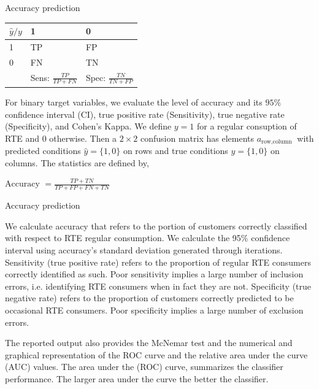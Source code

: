 \documentclass[12pt]{beamer}
\begin{document}
\begin{frame}{Accuracy prediction}
	\scriptsize
\begin{table}[]
	\begin{tabular}{|l|l|l|}
		\hline
		$\hat{y}/y$ & 1                         & 0                         \\ \hline
		1           & TP                        & FP                        \\ \hline
		0           & FN                        & TN                        \\ \hline
		& Sens: $\frac{TP}{TP+FN}$ & Spec: $\frac{TN}{TN+FP}$ \\ \hline
	\end{tabular}
\end{table}
	
For binary target variables, we evaluate the level of accuracy and its $95 \%$ confidence interval (CI), true positive rate (Sensitivity), true negative rate (Specificity), and Cohen's Kappa. We define  $y=1$ for a regular consuption of RTE and 0 otherwise. Then a $2 \times 2$ confusion matrix has elements $a_{\text {row,column }}$ with predicted conditions $\widehat{y}=\{1,0\}$ on rows and true conditions $y=\{1,0\}$ on columns. The statistics are defined by,

	$\text{Accuracy }=\frac{TP+TN}{TP+FP+FN+TN}$

\end{frame}

\begin{frame}{Accuracy prediction}
	\scriptsize

We calculate accuracy that refers to the portion of customers correctly classified with respect to RTE regular consumption.
We calculate the 95\% confidence interval using accuracy’s standard deviation generated through iterations. 
Sensitivity (true positive rate) refers to the proportion of regular RTE consumers correctly identified as such. Poor sensitivity implies a large number of inclusion errors, i.e. identifying RTE consumers when in fact they are not.  Specificity (true negative rate) refers to the proportion of customers correctly predicted to be occasional RTE consumers. Poor specificity implies a large number of exclusion errors. 

The reported output also provides the McNemar test and the numerical and graphical representation of the ROC curve and the relative area under the curve (AUC) values. The area under the (ROC) curve, summarizes the classifier performance. The larger area under the curve the better the classifier.
\end{frame}
\end{document}
